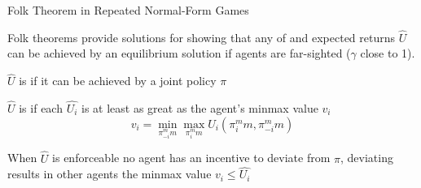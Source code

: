 \begin{frame}{Folk Theorem in Repeated Normal-Form Games}

    Folk theorems provide solutions for  showing that any  of  and  expected returns \(\hat{U}\) can be achieved by an equilibrium solution if agents are far-sighted (\(\gamma\) close to 1).

    \blist
        \item \(\hat{U}\) is  if it can be achieved by a joint policy \(\pi\)
        \item \(\hat{U}\) is  if each \(\hat{U_i}\) is at least as great as the agent's minmax value \(v_i\)
    \elist    
    \begin{equation*}
        v_i = \min_{\pi_{-i}^mm}\max_{\pi_{i}^mm}U_i(\pi_{i}^mm, \pi_{-i}^mm)
    \end{equation*}

    \blist
        \item When \(\hat{U}\) is enforceable no agent has an incentive to deviate from \(\pi\), deviating results in other agents  the minmax value \(v_i \leq \hat{U_i}\)
    \elist

\end{frame}


    

  
  
  
